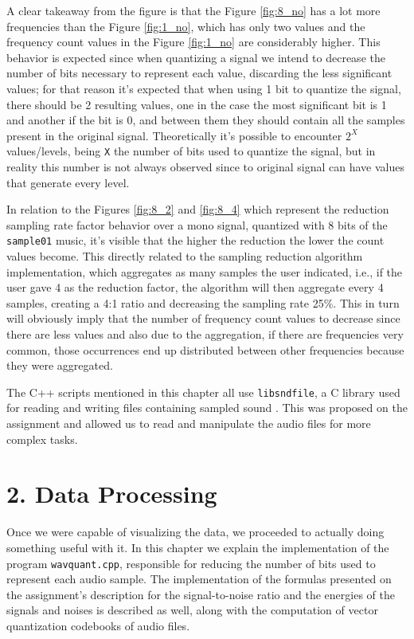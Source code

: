 \documentclass[12pt]{article}
\begin{document}
A clear takeaway from the figure is that the Figure \ref{fig:8_no} has a lot more frequencies than the Figure \ref{fig:1_no}, which has only two values and the frequency count values in the Figure \ref{fig:1_no} are considerably higher. This behavior is expected since when quantizing a signal we intend to decrease the number of bits necessary to represent each value, discarding the less significant values; for that reason it's expected that when using 1 bit to quantize the signal, there should be 2 resulting values, one in the case the most significant bit is 1 and another if the bit is 0, and between them they should contain all the samples present in the original signal. Theoretically it's possible to encounter $2^{X}$ values/levels, being \texttt{X} the number of bits used to quantize the signal, but in reality this number is not always observed since to original signal can have values that generate every level.

In relation to the Figures \ref{fig:8_2} and \ref{fig:8_4} which represent the reduction sampling rate factor behavior over a mono signal, quantized with 8 bits of the \texttt{sample01} music, it's visible that the higher the reduction the lower the count values become. This directly related to the sampling reduction algorithm implementation, which aggregates as many samples the user indicated, i.e., if the user gave 4 as the reduction factor, the algorithm will then aggregate every 4 samples, creating a 4:1 ratio and decreasing the sampling rate 25\%. This in turn will obviously imply that the number of frequency count values to decrease since there are less values and also due to the aggregation, if there are frequencies very common, those occurrences end up distributed between other frequencies because they were aggregated.   

The C++ scripts mentioned in this chapter all use \texttt{libsndfile}, a C 
library used for reading and writing files containing sampled sound \cite{libsndfile}.
This was proposed on the assignment and allowed us to read and manipulate the 
audio files for more complex tasks.

\newpage
\section*{2. Data Processing}

Once we were capable of visualizing the data, we proceeded to actually doing 
something useful with it.
In this chapter we explain the implementation of the program \texttt{wavquant.cpp},
responsible for reducing the number of bits used to represent each audio sample.
The implementation of the formulas presented on the assignment's description for
the signal-to-noise ratio and the energies of the signals and noises is described
as well, along with the computation of vector quantization codebooks of audio files.
\end{document}

